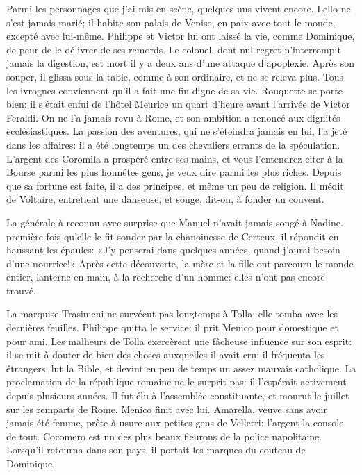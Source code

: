 Parmi les personnages que j'ai mis en scène, quelques-uns vivent encore. Lello ne s'est jamais marié; il habite son palais de Venise, en paix avec tout le monde, excepté avec lui-même. Philippe et Victor lui ont laissé la vie, comme Dominique, de peur de le délivrer de ses remords. Le colonel, dont nul regret n'interrompit jamais la digestion, est mort il y a deux ans d'une attaque d'apoplexie. Après son souper, il glissa sous la table, comme à son ordinaire, et ne se releva plus. Tous les ivrognes conviennent qu'il a fait une fin digne de sa vie. Rouquette se porte bien: il s'était enfui de l'hôtel Meurice un quart d'heure avant l'arrivée de Victor Feraldi. On ne l'a jamais revu à Rome, et son ambition a renoncé aux dignités ecclésiastiques. La passion des aventures, qui ne s'éteindra jamais en lui, l'a jeté dans les affaires: il a été longtemps un des chevaliers errants de la spéculation. L'argent des Coromila a prospéré entre ses mains, et vous l'entendrez citer à la Bourse parmi les plus honnêtes gens, je veux dire parmi les plus riches. Depuis que sa fortune est faite, il a des principes, et même un peu de religion. Il médit de Voltaire, entretient une danseuse, et songe, dit-on, à fonder un couvent.

La générale à reconnu avec surprise que Manuel n'avait jamais songé à Nadine. première fois qu'elle le fit sonder par la chanoinesse de Certeux, il répondit en haussant les épaules: «J'y penserai dans quelques années, quand j'aurai besoin d'une nourrice!» Après cette découverte, la mère et la fille ont parcouru le monde entier, lanterne en main, à la recherche d'un homme: elles n'ont pas encore trouvé.

\enlargethispage{\baselineskip}

La marquise Trasimeni ne survécut pas longtemps à Tolla; elle tomba avec les dernières feuilles. Philippe quitta le service: il prit Menico pour domestique et pour ami. Les malheurs de Tolla exercèrent une fâcheuse influence sur son esprit: il se mit à douter de bien des choses auxquelles il avait cru; il fréquenta les étrangers, lut la Bible, et devint en peu de temps un assez mauvais catholique. La proclamation de la république romaine ne le surprit pas: il l'espérait activement depuis plusieurs années. Il fut élu à l'assemblée constituante, et mourut le  juillet  sur les remparts de Rome. Menico finit avec lui. Amarella, veuve sans avoir jamais été femme, prête à usure aux petites gens de Velletri: l'argent la console de tout. Cocomero est un des plus beaux fleurons de la police napolitaine. Lorsqu'il retourna dans son pays, il portait les marques du couteau de Dominique.

